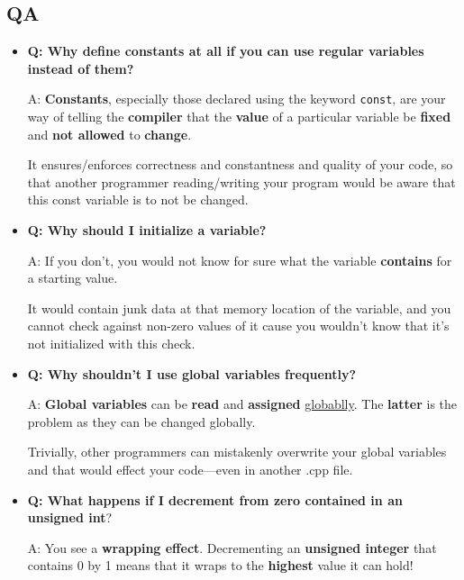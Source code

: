 \documentclass[10pt]{article}
\begin{document}
\subsection{QA}
\begin{itemize}
	\item \textbf{Q: Why define constants at all if you can use regular variables instead of them?}

	A: \textbf{Constants}, especially those declared using the keyword \verb|const|, are your way of telling the \textbf{compiler} that the \textbf{value} of a particular variable be \textbf{fixed} and \textbf{not allowed} to \textbf{change}.

	It ensures/enforces correctness and constantness and quality of your code, so that another programmer reading/writing your program would be aware that this const variable is to not be changed.\\ 

\item \textbf{Q: Why should I initialize a variable?}

A: If you don't, you would not know for sure what the variable \textbf{contains} for a starting value.

It would contain junk data at that memory location of the variable, and you cannot check against non-zero values of it cause you wouldn't know that it's not initialized with this check.\\ 

\item \textbf{Q: Why shouldn't I use global variables frequently?}

	A: \textbf{Global variables} can be \textbf{read} and \textbf{assigned} \underline{globablly}. The \textbf{latter} is the problem as they can be changed globally.

	Trivially, other programmers can mistakenly overwrite your global variables and that would effect your code---even in another .cpp file.\\ 

\item \textbf{Q: What happens if I decrement from zero contained in an unsigned int}?

	A: You see a \textbf{wrapping effect}. Decrementing an \textbf{unsigned integer} that contains 0 by 1 means that it wraps to the \textbf{highest} value it can hold!
\end{itemize}

\newpage
\end{document}
